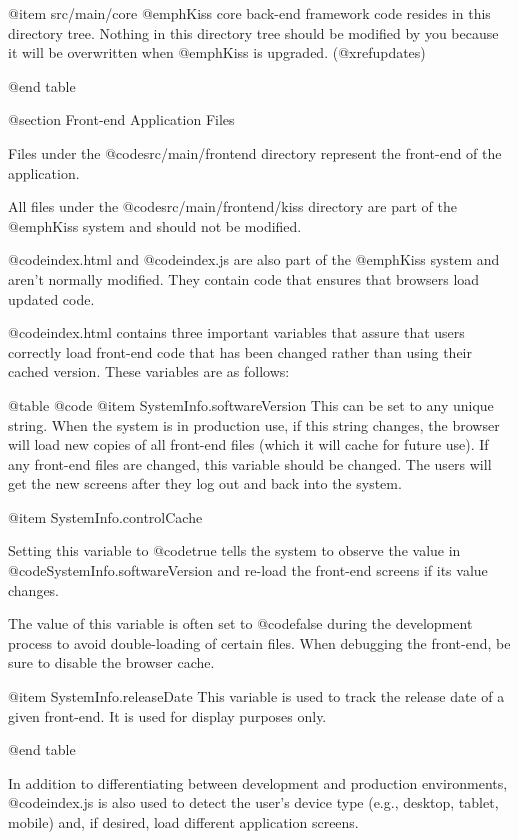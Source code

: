 @item src/main/core
@emph{Kiss} core back-end framework code resides in this directory tree. Nothing in this directory tree should be 
modified by you because it will be overwritten when @emph{Kiss} is upgraded.  (@xref{updates})

@end table


@section Front-end Application Files

Files under the @code{src/main/frontend} directory represent the
front-end of the application.

All files under the @code{src/main/frontend/kiss} directory are part of
the @emph{Kiss} system and should not be modified.

@code{index.html} and @code{index.js} are also part of the @emph{Kiss}
system and aren't normally modified.  They contain code that ensures
that browsers load updated code.

@code{index.html} contains three important variables that assure that users correctly load 
front-end code that has been changed rather than using their cached version.  These variables are as follows:

@table @code
@item SystemInfo.softwareVersion
This can be set to any unique string.  When the system is in production use, if this string changes,
the browser will load new copies of all front-end files (which it will cache for future use).
If any front-end files are changed, this variable should be changed.  The users will get the new screens 
after they log out and back into the system.

@item SystemInfo.controlCache

Setting this variable to @code{true} tells the system to observe the value in @code{SystemInfo.softwareVersion}
and re-load the front-end screens if its value changes.

The value of this variable is often set to @code{false} during the development process to avoid double-loading
of certain files.   When debugging the front-end, be sure to disable the browser cache.

@item SystemInfo.releaseDate 
This variable is used to track the release date of a given front-end.  It is used for display purposes only.

@end table

In addition to differentiating between development and production environments, @code{index.js}
is also used to detect the user's device type (e.g., desktop, tablet, mobile) and, if desired, 
load different application screens.


